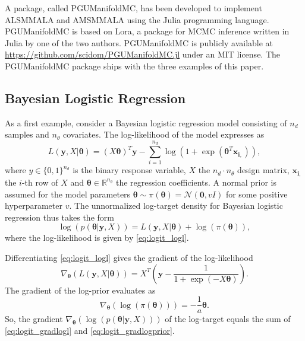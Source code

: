 \documentclass[twoside,11pt]{article}
\begin{document}
A package, called PGUManifoldMC, has been developed to implement ALSMMALA and AMSMMALA using the Julia programming language.
PGUManifoldMC is based on Lora, a package for MCMC inference written in Julia by one of the two authors. PGUManifoldMC is
publicly available at \url{https://github.com/scidom/PGUManifoldMC.jl} under an MIT license. The PGUManifoldMC package ships
with the three examples of this paper.

\subsection{Bayesian Logistic Regression}

As a first example, consider a Bayesian logistic regression model consisting of $n_d$ samples and $n_{\theta}$ covariates. 
The log-likelihood of the model expresses as
\begin{equation}
\label{eq:logit_logl}
L(\mathbf{y}, X | \boldsymbol{\theta})=
(X\boldsymbol{\theta})^T\mathbf{y}-
\sum_{i=1}^{n_d}\log\left(1+\exp(\boldsymbol{\theta}^T
\mathbf{x_{i,}})\right),
\end{equation}
where $y\in\{0,1\}^{n_d}$ is the binary response variable, $X$ the $n_d\cdot n_{\theta}$ design matrix, $\mathbf{x_{i,}}$ 
the $i$-th row of $X$ and $\boldsymbol{\theta}\in\mathbb{R}^{n_{\theta}}$ the regression coefficients. A normal prior is 
assumed for the model parameters $\boldsymbol{\theta}\sim\pi({\boldsymbol{\theta}})=\mathcal{N}(\boldsymbol{0},vI)$ for some
positive hyperparameter $v$. The unnormalized log-target density for Bayesian logistic regression thus takes the form
\begin{equation}
\log{(p(\boldsymbol{\theta}|\mathbf{y}, X))}=L(\mathbf{y}, X | \boldsymbol{\theta})+\log{(\pi(\boldsymbol{\theta}))},
\end{equation}
where the log-likelihood is given by \eqref{eq:logit_logl}.

Differentiating \eqref{eq:logit_logl} gives the gradient of the log-likelihood
\begin{equation}
\label{eq:logit_gradlogl}
\nabla_{\boldsymbol{\theta}}(L(\mathbf{y},X|\boldsymbol{\theta}))=
X^T\left(\mathbf{y}-
\frac{1}{1+\exp\left(-X\boldsymbol{\theta}\right)}\right).
\end{equation}
The gradient of the log-prior evaluates as
\begin{equation}
\label{eq:logit_gradlogprior}
\nabla_{\boldsymbol{\theta}}(\log{(\pi({\boldsymbol{\theta}}))})=
-\frac{1}{a}\boldsymbol{\theta}.
\end{equation}
So, the gradient
$\nabla_{\boldsymbol{\theta}}(\log{(p(\boldsymbol{\theta}|\mathbf{y}, X))})$ of the log-target equals the sum of
\eqref{eq:logit_gradlogl} and \eqref{eq:logit_gradlogprior}.
\end{document}
